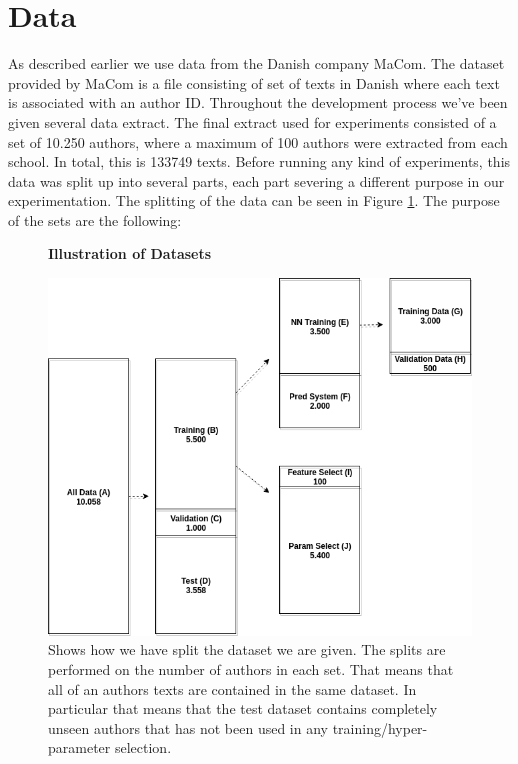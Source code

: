 \section{Data} \label{sec:data}

As described earlier we use data from the Danish company MaCom. The dataset
provided by MaCom is a file consisting of set of texts in Danish where each text
is associated with an author ID. Throughout the development process we've been
given several data extract. The final extract used for experiments consisted of
a set of 10.250 authors, where a maximum of 100 authors were extracted from each
school. In total, this is 133749 texts. Before running any kind of experiments,
this data was split up into several parts, each part severing a different
purpose in our experimentation. The splitting of the data can be seen in Figure
\ref{fig:data_split}. The purpose of the sets are the following:

\begin{figure}
    \centering
    \textbf{Illustration of Datasets}\par\medskip
    \includegraphics[width=.8\textwidth]{./pictures/data/Data.png}
    \caption{Shows how we have split the dataset we are given. The splits are
        performed on the number of authors in each set. That means that all of
        an authors texts are contained in the same dataset. In particular that
        means that the test dataset contains completely unseen authors that has
        not been used in any training/hyper-parameter selection.}
    \label{fig:data_split}
\end{figure}

